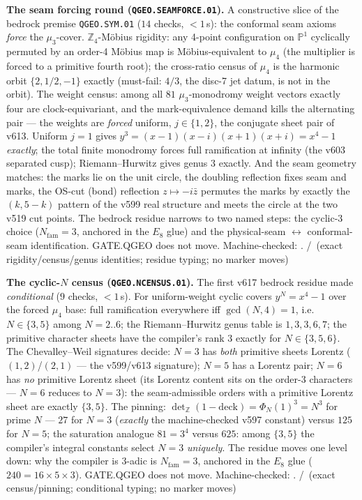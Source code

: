 \documentclass[11pt,a4paper]{article}
\theoremstyle{definition}
\begin{document}
\par\smallskip\noindent\textbf{The seam forcing round
(\texttt{QGEO.SEAMFORCE.01}).}
A constructive slice of the bedrock premise \texttt{QGEO.SYM.01}
($14$ checks, ${<}1$\,s): the conformal seam axioms \emph{force} the
$\mu_3$-cover.  $\mathbb{Z}_4$-M\"obius rigidity: any 4-point
configuration on $\mathbb{P}^1$ cyclically permuted by an order-4
M\"obius map is M\"obius-equivalent to $\mu_4$ (the multiplier is
forced to a primitive fourth root); the cross-ratio census of $\mu_4$
is the harmonic orbit $\{2,1/2,-1\}$ exactly (must-fail: $4/3$, the
disc-7 jet datum, is not in the orbit).  The weight census: among all
$81$ $\mu_3$-monodromy weight vectors exactly four are
clock-equivariant, and the mark-equivalence demand kills the
alternating pair --- the weights are \emph{forced} uniform,
$j\in\{1,2\}$, the conjugate sheet pair of v613.  Uniform $j=1$ gives
$y^3=(x-1)(x-i)(x+1)(x+i)=x^4-1$ \emph{exactly}; the total finite
monodromy forces full ramification at infinity (the v603 separated
cusp); Riemann--Hurwitz gives genus $3$ exactly.  And the seam
geometry matches: the marks lie on the unit circle, the doubling
reflection fixes seam and marks, the OS-cut (bond) reflection
$z\mapsto-i\bar z$ permutes the marks by exactly the $(k,5{-}k)$
pattern of the v599 real structure and meets the circle at the two
v519 cut points.  The bedrock residue narrows to two named steps: the
cyclic-3 choice ($N_{\mathrm{fam}}=3$, anchored in the $E_8$ glue)
and the physical-seam $\leftrightarrow$ conformal-seam
identification.  GATE.QGEO does not move.
Machine-checked: .
\mE/\mC\ (exact rigidity/census/genus identities; residue typing;
no marker moves)
\par\smallskip

\par\smallskip\noindent\textbf{The cyclic-$N$ census
(\texttt{QGEO.NCENSUS.01}).}
The first v617 bedrock residue made \emph{conditional} ($9$ checks,
${<}1$\,s).  For uniform-weight cyclic covers $y^N=x^4-1$ over the
forced $\mu_4$ base: full ramification everywhere iff
$\gcd(N,4)=1$, i.e.\ $N\in\{3,5\}$ among $N=2..6$; the
Riemann--Hurwitz genus table is $1,3,3,6,7$; the primitive character
sheets have the compiler's rank $3$ exactly for $N\in\{3,5,6\}$.
The Chevalley--Weil signatures decide: $N=3$ has \emph{both}
primitive sheets Lorentz ($(1,2)$/$(2,1)$ --- the v599/v613
signature); $N=5$ has a Lorentz pair; $N=6$ has \emph{no} primitive
Lorentz sheet (its Lorentz content sits on the order-3 characters
--- $N=6$ reduces to $N=3$): the seam-admissible orders with a
primitive Lorentz sheet are exactly $\{3,5\}$.  The pinning:
$\det_{\mathbb Z}(1-\mathrm{deck})=\Phi_N(1)^3=N^3$ for prime $N$
--- $27$ for $N=3$ (\emph{exactly} the machine-checked v597
constant) versus $125$ for $N=5$; the saturation analogue $81=3^4$
versus $625$: among $\{3,5\}$ the compiler's integral constants
select $N=3$ \emph{uniquely}.  The residue moves one level down: why
the compiler is 3-adic is $N_{\mathrm{fam}}=3$, anchored in the
$E_8$ glue ($240=16\times5\times3$).  GATE.QGEO does not move.
Machine-checked: .
\mE/\mC\ (exact census/pinning; conditional typing; no marker moves)
\par\smallskip
\end{document}
